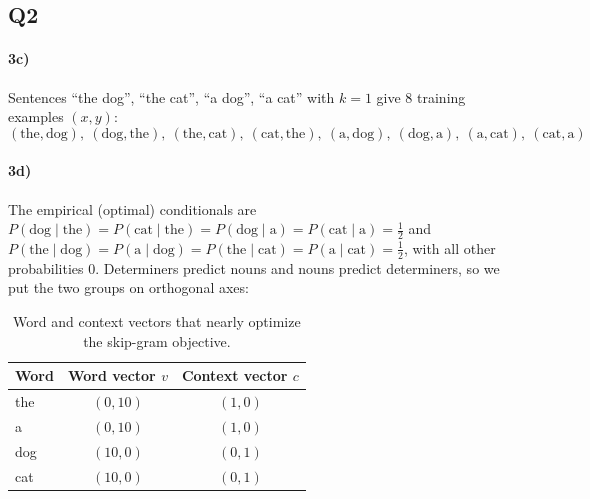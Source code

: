 \documentclass[10pt]{article}
\begin{document}
\subsection*{Q2}

\paragraph{3c)} Sentences ``the dog'', ``the cat'', ``a dog'', ``a cat'' with $k = 1$ give 8 training examples
$(x, y)$:
\[
(\text{the}, \text{dog}),\ (\text{dog}, \text{the}),\ (\text{the}, \text{cat}),\ (\text{cat}, \text{the}),\
(\text{a}, \text{dog}),\ (\text{dog}, \text{a}),\ (\text{a}, \text{cat}),\ (\text{cat}, \text{a})
\]

\paragraph{3d)} The empirical (optimal) conditionals are
$P(\text{dog} \mid \text{the}) = P(\text{cat} \mid \text{the}) = P(\text{dog} \mid \text{a}) = P(\text{cat} \mid
\text{a}) = \tfrac12$ and $P(\text{the} \mid \text{dog}) = P(\text{a} \mid \text{dog}) = P(\text{the} \mid
\text{cat}) = P(\text{a} \mid \text{cat}) = \tfrac12$, with all other probabilities 0. Determiners predict nouns
and nouns predict determiners, so we put the two groups on orthogonal axes:

\begin{table}[H]
\centering
\small
\begin{tabular}{lcc}
\toprule
Word & Word vector $v$ & Context vector $c$ \\
\midrule
the & $(0, 10)$ & $(1, 0)$ \\
a & $(0, 10)$ & $(1, 0)$ \\
dog & $(10, 0)$ & $(0, 1)$ \\
cat & $(10, 0)$ & $(0, 1)$ \\
\bottomrule
\end{tabular}
\caption{Word and context vectors that nearly optimize the skip-gram objective.}
\label{tab:3d}
\end{table}
\end{document}
